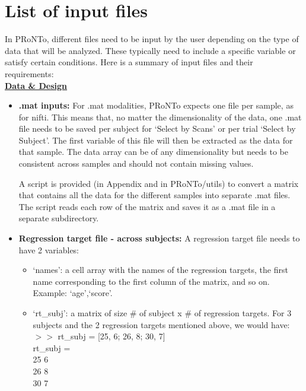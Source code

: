 
\chapter{List of input files}
\label{chap:input_files}
\minitoc

In PRoNTo, different files need to be input by the user depending on the type of data that will be analyzed. These typically need to include a specific variable or satisfy certain conditions. Here is a summary of input files and their requirements:
\\

\noindent \underline{\textbf{Data \& Design}}

\begin{itemize}

\item \textbf{.mat inputs:} For .mat modalities, PRoNTo expects one file per sample, as for nifti. This means that, no matter the dimensionality of the data, one .mat file needs to be saved per subject for `Select by Scans' or per trial
`Select by Subject'. The first variable of this file will then be extracted as the data for that sample. The data array can be of any dimensionality but needs to be consistent across samples and should not contain missing values.

A script is provided (in Appendix and in PRoNTo/utils) to convert a matrix that contains all the data for the different samples into separate .mat files. The script reads each row of the matrix and saves it as a .mat file in a separate subdirectory.

\item \textbf{Regression target file - across subjects:} A regression target file needs to have 2 variables:

\begin{itemize}
\item `names': a cell array with the names of the regression targets, the first name corresponding to the first column of the matrix, and so on. Example: {`age',`score'}.

\item `rt\_subj': a matrix of size \# of subject x \# of regression targets. For 3 subjects and the 2 regression targets mentioned above, we would have:
\\

$>>$ rt\_subj = [25, 6; 26, 8; 30, 7]
\\

rt\_subj = \\
25 6 \\
26 8 \\
30 7


\end{itemize}
\end{itemize}
